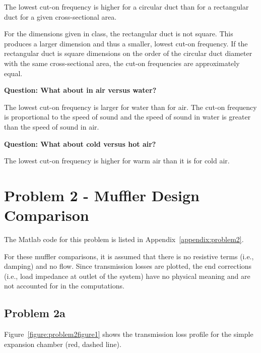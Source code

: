  The lowest cut-on frequency is higher for a circular duct than for a
 rectangular duct for a given cross-sectional area.

 For the dimensions given in class, the rectangular duct is not square.
 This produces a larger dimension and thus a smaller, lowest cut-on
 frequency.  If the rectangular duct is square dimensions on the order
 of the circular duct diameter with the same cross-sectional area, the
 cut-on frequencies are approximately equal.



\vspace{0.25cm}
\textbf{Question:  What about in air versus water?}

 The lowest cut-on frequency is larger for water than for air.  The cut-on
 frequency is proportional to the speed of sound and the speed of sound in
 water is greater than the speed of sound in air.



\vspace{0.25cm}
\textbf{Question:  What about cold versus hot air?}

 The lowest cut-on frequency is higher for warm air than it is for cold air.









\newpage
\section*{Problem 2 - Muffler Design Comparison}

The Matlab code for this problem is listed in Appendix~\ref{appendix:problem2}.

\vspace{0.25cm}
For these muffler comparisons, it is assumed that there is no resistive terms (i.e., damping) and no flow.  Since transmission losses are plotted, the end corrections (i.e., load impedance at outlet of the system) have no physical meaning and are not accounted for in the computations.


\subsection*{Problem 2a}

Figure~\ref{figure:problem2figure1} shows the transmission loss profile for the simple expansion chamber (red, dashed line).





